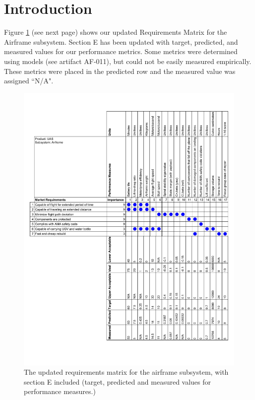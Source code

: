 \documentclass[]{auvsi_doc}
\begin{document}
\begin{AUVSITitlePage}
\begin{artifacttable}
\end{artifacttable}
\end{AUVSITitlePage}

\section{Introduction}
Figure \ref{fig:reqmatrix} (see next page) shows our updated Requirements Matrix for the Airframe subsystem. Section E has been updated with target, predicted, and measured values for our performance metrics. Some metrics were determined using models (see artifact AF-011), but could not be easily measured empirically. These metrics were placed in the predicted row and the measured value was assigned ``N/A".


\begin{figure}[h!]
	\centering
	\includegraphics[width=1.0\textwidth]{reqmatrix.pdf}
	\caption{The updated requirements matrix for the airframe subsystem, with section E included (target, predicted and measured values for performance measures.)}
	\label{fig:reqmatrix}
\end{figure}
\end{document}
